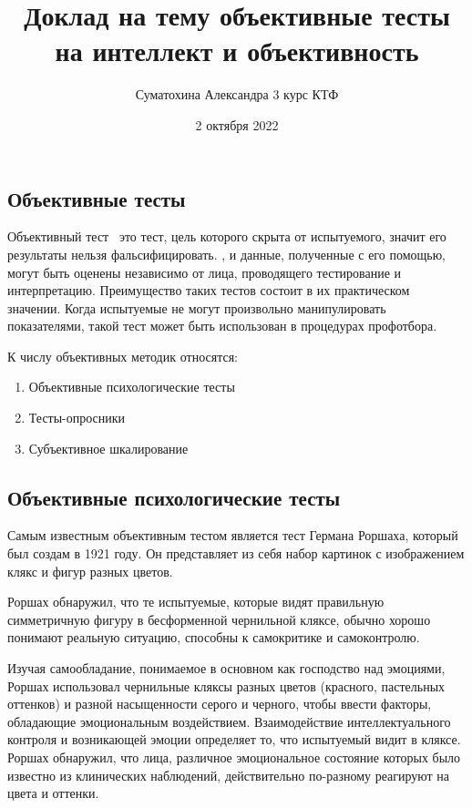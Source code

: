 
\title{Доклад на тему объективные тесты на интеллект и объективность}
\author{Суматохина Александра 3 курс КТФ}
\date{2 октября 2022}

\maketitle
\subsection*{Объективные тесты}
Объективный тест \textendash\ это тест, цель которого скрыта от испытуемого, значит 
его результаты нельзя фальсифицировать. 
, и данные, полученные с его помощью, могут быть оценены независимо от лица, 
проводящего тестирование и интерпретацию. 
Преимущество таких тестов состоит в их практическом значении. 
Когда испытуемые не могут произвольно манипулировать показателями, 
такой тест может быть использован в процедурах профотбора.

К числу объективных методик относятся:
\begin{enumerate}
    \item Объективные психологические тесты
    \item Тесты-опросники
    \item Субъективное шкалирование
\end{enumerate} 

\subsection*{Объективные психологические тесты}
Самым известным объективным тестом является тест Германа Роршаха, 
который был создам в 1921 году. Он представляет из себя набор картинок с 
изображением клякс и фигур разных цветов. 

Роршах обнаружил, что те испытуемые, которые видят правильную 
симметричную фигуру в бесформенной чернильной кляксе, обычно 
хорошо понимают реальную ситуацию, способны к самокритике и 
самоконтролю.

Изучая самообладание, понимаемое в основном как господство над 
эмоциями, Роршах использовал чернильные кляксы разных цветов 
(красного, пастельных оттенков) и разной насыщенности серого и 
черного, чтобы ввести факторы, обладающие эмоциональным воздействием. 
Взаимодействие интеллектуального контроля и возникающей эмоции 
определяет то, что испытуемый видит в кляксе. Роршах обнаружил, 
что лица, различное эмоциональное состояние которых было известно 
из клинических наблюдений, действительно по-разному реагируют на 
цвета и оттенки.


